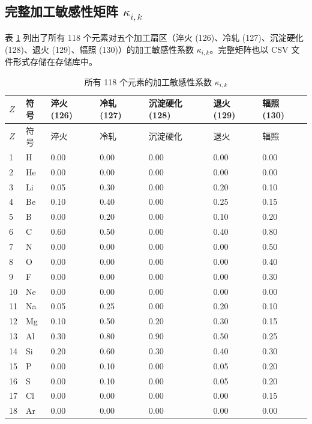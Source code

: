 \documentclass[12pt,a4paper]{article}
\begin{document}
	\subsection{完整加工敏感性矩阵 \(\kappa_{i,k}\)}
	\label{subsec:full-kappa-ik}
	
	表 \ref{tab:kappa-ik-full} 列出了所有 118 个元素对五个加工扇区（淬火 (126)、冷轧 (127)、沉淀硬化 (128)、退火 (129)、辐照 (130)）的加工敏感性系数 \(\kappa_{i,k}\)。完整矩阵也以 CSV 文件形式存储在存储库中。
	
	\begin{longtable}{p{2.2cm}p{1.2cm}p{2.2cm}p{2.2cm}p{2.2cm}p{2.2cm}p{2.2cm}}
		\caption{所有 118 个元素的加工敏感性系数 \(\kappa_{i,k}\)} \label{tab:kappa-ik-full} \\
		\toprule
		\(Z\) & 符号 & 淬火 (126) & 冷轧 (127) & 沉淀硬化 (128) & 退火 (129) & 辐照 (130) \\
		\midrule
		\endfirsthead
		\toprule
		\(Z\) & 符号 & 淬火 & 冷轧 & 沉淀硬化 & 退火 & 辐照 \\
		\midrule
		\endhead
		1  & H   & 0.00 & 0.00 & 0.00 & 0.00 & 0.00 \\
		2  & He  & 0.00 & 0.00 & 0.00 & 0.00 & 0.00 \\
		3  & Li  & 0.05 & 0.30 & 0.00 & 0.20 & 0.10 \\
		4  & Be  & 0.10 & 0.40 & 0.00 & 0.25 & 0.15 \\
		5  & B   & 0.00 & 0.20 & 0.00 & 0.10 & 0.20 \\
		6  & C   & 0.60 & 0.50 & 0.00 & 0.40 & 0.80 \\
		7  & N   & 0.00 & 0.00 & 0.00 & 0.00 & 0.50 \\
		8  & O   & 0.00 & 0.00 & 0.00 & 0.00 & 0.40 \\
		9  & F   & 0.00 & 0.00 & 0.00 & 0.00 & 0.30 \\
		10 & Ne  & 0.00 & 0.00 & 0.00 & 0.00 & 0.00 \\
		11 & Na  & 0.05 & 0.25 & 0.00 & 0.20 & 0.10 \\
		12 & Mg  & 0.10 & 0.50 & 0.20 & 0.30 & 0.15 \\
		13 & Al  & 0.30 & 0.80 & 0.90 & 0.50 & 0.25 \\
		14 & Si  & 0.20 & 0.60 & 0.30 & 0.40 & 0.30 \\
		15 & P   & 0.00 & 0.10 & 0.00 & 0.05 & 0.20 \\
		16 & S   & 0.00 & 0.10 & 0.00 & 0.05 & 0.20 \\
		17 & Cl  & 0.00 & 0.00 & 0.00 & 0.00 & 0.15 \\
		18 & Ar  & 0.00 & 0.00 & 0.00 & 0.00 & 0.00 \\

\end{longtable}
\end{document}
